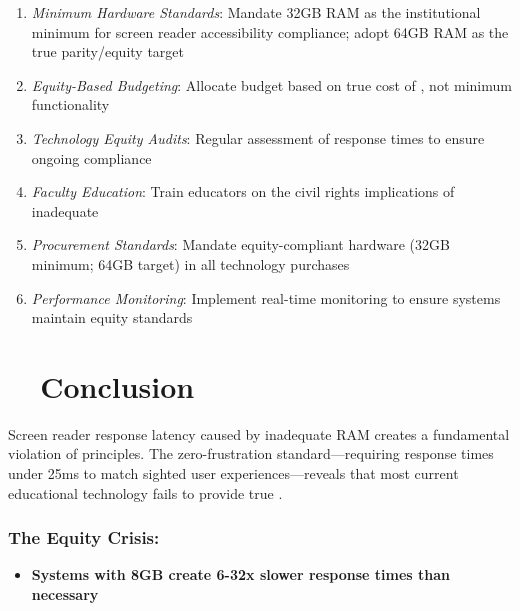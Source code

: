 \begin{enumerate}
	\item \emph{Minimum Hardware Standards}: Mandate 32GB RAM as the institutional minimum for screen reader accessibility compliance; adopt 64GB RAM as the true parity/equity target \supercite{EducationalEquityReport2024}
	\item \emph{Equity-Based Budgeting}: Allocate budget based on true cost of , not minimum functionality \supercite{EquityInFundingEducation}
	\item \emph{Technology Equity Audits}: Regular assessment of response times to ensure ongoing compliance \supercite{TechnologyAccessibilityAudits}
	\item \emph{Faculty Education}: Train educators on the civil rights implications of inadequate  \supercite{AccessibilityTrainingEducation}
	\item \emph{Procurement Standards}: Mandate equity-compliant hardware (32GB minimum; 64GB target) in all  technology purchases \supercite{AccessibleProcurementGuidelines}
	\item \emph{Performance Monitoring}: Implement real-time  monitoring to ensure systems maintain equity standards \supercite{SystemPerformanceMonitoring}
\end{enumerate}

\section{~~Conclusion}\label{chapter1-conclusion}

Screen reader response latency caused by inadequate RAM creates a fundamental violation of  principles. The zero-frustration standard—requiring response times under 25ms to match sighted user experiences—reveals that most current educational technology fails to provide true  \supercite{EducationalEquityReport2024, W3C2018WCAG21}.

\subsubsection{The Equity Crisis:}

\begin{itemize}
	\item \textbf{Systems with 8GB  create 6-32x slower response times than necessary} \supercite{EducationalEquityReport2024}
\end{itemize}


